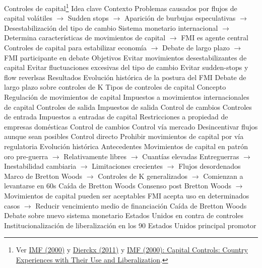 \documentclass{nuevotema}
\begin{document}
\begin{esquemal}
		\2 Controles de capital\footnote{Ver \href{https://www.imf.org/external/pubs/ft/op/op190/pdf/part1.pdf}{IMF (2000)} y \href{https://ecpr.eu/Filestore/PaperProposal/419f54b4-73ce-42cf-b3fe-4e3e6dd844d0.pdf}{Dierckx (2011)} y \href{https://www.imf.org/external/pubs/ft/op/op190/index.htm}{IMF (2000): Capital Controls: Country Experiences with Their Use and Liberalization}.}
			\3 Idea clave
				\4 Contexto
				\4[] Problemas causados por flujos de capital volátiles
				\4[] $\to$ Sudden stops
				\4[] $\to$ Aparición de burbujas especulativas
				\4[] $\to$ Desestabilización del tipo de cambio
				\4[] Sistema monetario internacional
				\4[] $\to$ Determina características de movimientos de capital
				\4[] $\to$ FMI es agente central
				\4[] Controles de capital para estabilizar economía
				\4[] $\to$ Debate de largo plazo
				\4[] $\to$ FMI participante en debate
				\4 Objetivos
				\4[] Evitar movimientos desestabilizantes de capital
				\4[] Evitar fluctuaciones excesivas del tipo de cambio
				\4[] Evitar sudden-stops y flow reverlsas
				\4 Resultados
				\4[] Evolución histórica de la postura del FMI
				\4[] Debate de largo plazo sobre controles de K
			\3 Tipos de controles de capital
				\4 Concepto
				\4[] Regulación de movimientos de capital
				\4[] Impuestos a movimientos internacionales de capital
				\4 Controles de salida
				\4[] Impuestos de salida
				\4[] Control de cambios
				\4 Controles de entrada
				\4[] Impuestos a entradas de capital
				\4[] Restricciones a propiedad de empresas domésticas
				\4[] Control de cambios
				\4 Control vía mercado
				\4[] Desincentivar flujos aunque sean posibles
				\4 Control directo
				\4[] Prohibir movimientos de capital por vía regulatoria
			\3 Evolución histórica
				\4 Antecedentes
				\4[] Movimientos de capital en patrón oro pre-guerra
				\4[] $\to$ Relativamente libres
				\4[] $\to$ Cuantías elevadas
				\4[] Entreguerras
				\4[] $\to$ Inestabilidad cambiaria
				\4[] $\to$ Limitaciones crecientes
				\4[] $\to$ Flujos desordenados
				\4 Marco de Bretton Woods
				\4[] $\to$ Controles de K generalizados
				\4[] $\to$ Comienzan a levantarse en 60s
				\4[] Caída de Bretton Woods
				\4[] Consenso post Bretton Woods
				\4[] $\to$ Movimientos de capital  pueden ser aceptables
				\4[] FMI acepta uso en determinados casos
				\4[] $\to$ Reducir vencimiento medio de financiación
				\4 Caída de Bretton Woods
				\4[] Debate sobre nuevo sistema monetario
				\4[] Estados Unidos en contra de controles
				\4 Institucionalización de liberalización en los 90
				\4[] Estados Unidos principal promotor

\end{esquemal}
\end{document}
